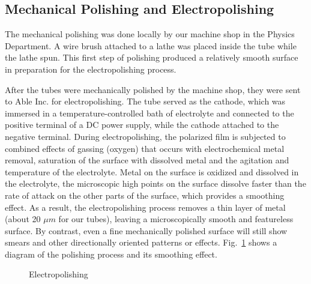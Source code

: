 \subsection{Mechanical Polishing and Electropolishing}

The mechanical polishing was done locally by our machine shop in the Physics Department. A wire brush attached to a lathe was placed inside the tube while the lathe spun. This first step of polishing produced a relatively smooth surface in preparation for the electropolishing process.

After the tubes were mechanically polished by the machine shop, they were sent to Able Inc. for electropolishing. The tube served as the cathode, which was immersed in a temperature-controlled bath of electrolyte and connected to the positive terminal of a DC power supply, while the cathode attached to the negative terminal. During electropolishing, the polarized film is subjected to combined effects of gassing (oxygen) that occurs with electrochemical metal removal, saturation of the surface with dissolved metal and the agitation and temperature of the electrolyte. Metal on the surface is oxidized and dissolved in the electrolyte, the microscopic high points on the surface dissolve faster than the rate of attack on the other parts of the surface, which provides a smoothing effect. As a result, the electropolishing process removes a thin layer of metal (about 20 $\mu m$ for our tubes), leaving a microscopically smooth and featureless surface. By contrast, even a fine mechanically polished surface will still show smears and other directionally oriented patterns or effects\cite{Electropolishing}. Fig.~\ref{Electropolishing} shows a diagram of the polishing process and its smoothing effect.

\begin{figure}[t!]
	\centering
	\caption{{Electropolishing~\cite{Electropolishing}}}
	\label{Electropolishing}
\end{figure}

